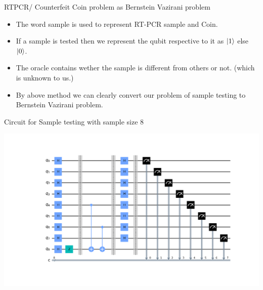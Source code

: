 \documentclass{beamer} %
\begin{document}
	\begin{frame}
		\begin{block}{RTPCR/ Counterfeit Coin problem as Bernstein Vazirani problem}
			\begin{itemize}
				\item The word sample is used to represent RT-PCR sample and Coin. 
				\item If a sample is tested then we represent the qubit respective to it as \(\ket{1}\) else \(\ket{0}\). 
				\item The oracle contains wether the sample is different from others or not. (which is unknown to us.)
				\item By above method we can clearly convert our problem of sample testing to Bernstein Vazirani problem.
			\end{itemize}
		\end{block}
	\end{frame}
	\begin{frame}
		\begin{block}{Circuit for Sample testing with sample size 8}
			
		\end{block}
		\begin{center}
			\includegraphics[scale = 0.3]{Figures/circuit-8.png}
		\end{center}
	\end{frame}
\end{document}
